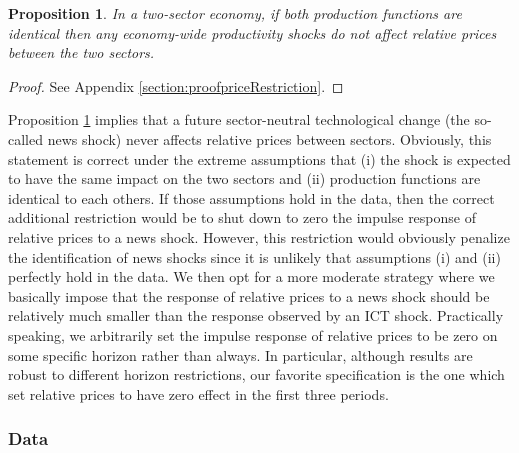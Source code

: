 \documentclass[12pt]{article}
\newtheorem{prop}{Proposition}
\begin{document}
\begin{prop}\label{prop:priceRestriction}
In a two-sector economy, if both production functions are identical then any economy-wide productivity shocks do not affect relative prices between the two sectors.
\end{prop}
\begin{proof}
	See Appendix \ref{section:proofpriceRestriction}.
\end{proof}

Proposition \ref{prop:priceRestriction} implies that a future sector-neutral technological change (the so-called news shock) never affects relative prices between sectors. Obviously, this statement is correct under the extreme assumptions that (i) the shock is expected to have the same impact on the two sectors and (ii) production functions are identical to each others. If those assumptions hold in the data, then the correct additional restriction would be to shut down to zero the impulse response of relative prices to a news shock. However, this restriction would obviously penalize the identification of news shocks since it is unlikely that assumptions (i) and (ii) perfectly hold in the data. We then opt for a more moderate strategy where we basically impose that the response of relative prices to a news shock should be relatively much smaller than the response observed by an ICT shock. Practically speaking, we arbitrarily set the impulse response of relative prices to be zero on some specific horizon rather than always. In particular, although results are robust to different horizon restrictions, our favorite specification is the one which set relative prices to have zero effect in the first three periods. 

\subsubsection*{Data}
\end{document}
